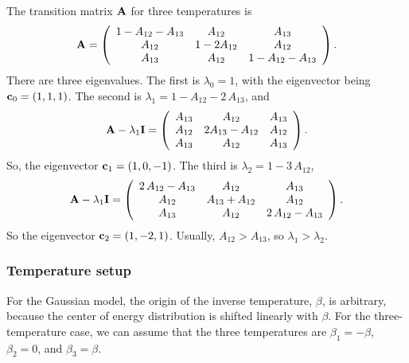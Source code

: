 \documentclass[aip,jcp,preprint,notitlepage, superscriptaddress]{revtex4-1}
\begin{document}
The transition matrix $\mathbf{A}$
for three temperatures is
\begin{align*}
\mathbf{A}
=
\left(
  \begin{array}{ccc}
    1 - A_{12} - A_{13}   &     A_{12}    &  A_{13}             \\
    A_{12}                &  1 - 2 A_{12} &  A_{12}             \\
    A_{13}                &     A_{12}    &  1 - A_{12} - A_{13}
  \end{array}
\right).
\end{align*}
%
There are three eigenvalues.
%
The first is $\lambda_0 = 1$,
with the eigenvector being $\mathbf{c}_0 = (1, 1, 1)$.
%
The second is $\lambda_1 = 1 - A_{12} - 2 \, A_{13}$,
and
\begin{align*}
\mathbf{A} - \lambda_1 \mathbf{I}
=
\left(
  \begin{array}{ccc}
    A_{13}   &     A_{12}           &  A_{13} \\
    A_{12}   &  2 A_{13} - A_{12}   &  A_{12} \\
    A_{13}   &     A_{12}           &  A_{13}
  \end{array}
\right).
\end{align*}
%
So, the eigenvector $\mathbf{c}_1 = (1, 0, -1)$.
%
The third is $\lambda_2 = 1 - 3 \, A_{12}$,
%
\begin{align*}
\mathbf{A} - \lambda_1 \mathbf{I}
=
\left(
  \begin{array}{ccc}
    2 \, A_{12} - A_{13}   &     A_{12}         &  A_{13} \\
    A_{12}                 &  A_{13} + A_{12}   &  A_{12} \\
    A_{13}                 &     A_{12}         &  2 \, A_{12} - A_{13}
  \end{array}
\right).
\end{align*}
%
So the eigenvector $\mathbf{c}_2 = (1, -2, 1)$.
%
Usually,
$A_{12} > A_{13}$,
so $\lambda_1 > \lambda_2$.



\subsubsection{Temperature setup}



For the Gaussian model,
the origin of the inverse temperature, $\beta$,
is arbitrary,
because the center of
energy distribution is shifted linearly with $\beta$.
%
For the three-temperature case,
we can assume that the three temperatures are
$\beta_1 = -\beta$,
$\beta_2 = 0$,
and
$\beta_3 = \beta$.
\end{document}
